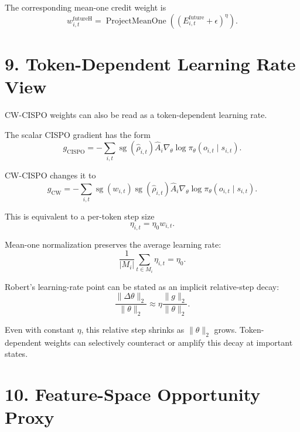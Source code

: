 \documentclass[11pt]{article}
\newcommand{\sg}{\operatorname{sg}}
\newcommand{\ProjectMeanOne}{\operatorname{ProjectMeanOne}}
\begin{document}
The corresponding mean-one credit weight is
\begin{equation}
  w^{\mathrm{futureH}}_{i,t}
  =
  \ProjectMeanOne
  \left(
    \left(E^{\mathrm{future}}_{i,t}+\epsilon\right)^\eta
  \right).
\end{equation}

\section*{9. Token-Dependent Learning Rate View}

CW-CISPO weights can also be read as a token-dependent learning rate.

The scalar CISPO gradient has the form
\begin{equation}
  g_{\mathrm{CISPO}}
  =
  -
  \sum_{i,t}
  \sg(\hat \rho_{i,t})
  \hat A_i
  \nabla_\theta
  \log \pi_\theta(o_{i,t} \mid s_{i,t}).
\end{equation}

CW-CISPO changes it to
\begin{equation}
  g_{\mathrm{CW}}
  =
  -
  \sum_{i,t}
  \sg(w_{i,t})
  \sg(\hat \rho_{i,t})
  \hat A_i
  \nabla_\theta
  \log \pi_\theta(o_{i,t} \mid s_{i,t}).
\end{equation}

This is equivalent to a per-token step size
\begin{equation}
  \eta_{i,t}
  =
  \eta_0 w_{i,t}.
\end{equation}

Mean-one normalization preserves the average learning rate:
\begin{equation}
  \frac{1}{|M_i|}
  \sum_{t \in M_i}
  \eta_{i,t}
  =
  \eta_0.
\end{equation}

Robert's learning-rate point can be stated as an implicit relative-step decay:
\begin{equation}
  \frac{\|\Delta \theta\|_2}{\|\theta\|_2}
  \approx
  \eta
  \frac{\|g\|_2}{\|\theta\|_2}.
\end{equation}

Even with constant $\eta$, this relative step shrinks as $\|\theta\|_2$ grows.
Token-dependent weights can selectively counteract or amplify this decay at
important states.

\section*{10. Feature-Space Opportunity Proxy}
\end{document}
